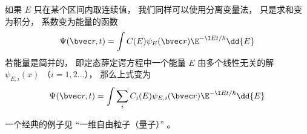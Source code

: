 如果 $E$ 只在某个区间内取连续值， 我们同样可以使用分离变量法， 只是求和变为积分， 系数变为能量的函数
\begin{equation}\label{eq_TDSE_3}
\Psi(\bvec r, t) = \int C(E) \psi_E(\bvec r) \E^{-\I E t/\hbar} \dd{E}
\end{equation}
若能量是简并的， 即定态薛定谔方程中一个能量 $E$ 由多个线性无关的解 $\psi_{E,i}(x)$ （$i=1,2\dots$）， 那么上式变为
\begin{equation}\label{eq_TDSE_4}
\Psi(\bvec r, t) = \int \sum_i C_i(E) \psi_{E,i}(\bvec r) \E^{-\I E t/\hbar} \dd{E}
\end{equation}

一个经典的例子见 “一维自由粒子（量子）” 。
